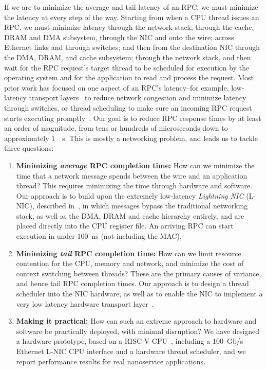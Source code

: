 If we are to minimize the average and tail latency of an RPC, we must minimize the latency at every step of the way. 
Starting from when a CPU thread issues an RPC, we must minimize latency through the network stack, through the cache, DRAM and DMA subsystem, through the NIC and onto the wire; across Ethernet links and through switches; and then from the destination NIC through the DMA, DRAM, and cache subsystem; through the network stack, and then wait for the RPC request's target thread to be scheduled for execution by the operating system and for the application to read and process the request.
Most prior work has focused on one aspect of an RPC's latency--for example, low-latency transport layers~\cite{homa, ndp, pfabric} to reduce network congestion and minimize latency through switches, or thread scheduling to make sure an incoming RPC request starts executing promptly~\cite{shinjuku, shenango}. 
Our goal is to reduce RPC response times by at least an order of magnitude, from tens or hundreds of microseconds down to approximately \SI{1}{\mu s}. 
This is mostly a networking problem, and leads us to tackle three questions:

\begin{enumerate}[topsep=0.4\baselineskip, leftmargin=20pt]
    \item {\bf Minimizing {\em average} RPC completion time:} How can we minimize the time that a network message spends between the wire and an application thread?
    This requires minimizing the time through hardware and software. Our approach is to build upon the extremely low-latency {\em Lightning NIC} (L-NIC), described in~\cite{lnic}, in which messages bypass the traditional networking stack, as well as the DMA, DRAM and cache hierarchy entirely, and are placed directly into the CPU register file.
    An arriving RPC can start execution in under \SI{100}{ns} (not including the MAC). 
    \item {\bf Minimizing {\em tail} RPC completion time:} How can we limit resource contention for the CPU, memory and network, and minimize the cost of context switching between threads?
    These are the primary causes of variance, and hence tail RPC completion times.
    Our approach is to design a thread scheduler into the NIC hardware, as well as to enable the NIC to implement a very low latency hardware transport layer~\cite{homa,ndp}.
    \item {\bf Making it practical:} How can such an extreme approach to hardware and software be practically deployed, with minimal disruption? 
    We have designed a hardware prototype, based on a RISC-V CPU~\cite{rocket-chip}, including a \SI{100}{Gb/s} Ethernet L-NIC CPU interface and a hardware thread scheduler, and we report performance results for real nanoservice applications.
\end{enumerate}

